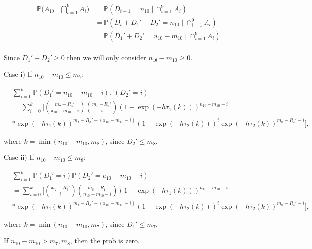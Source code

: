 \documentclass[a4paper]{article}
\theoremstyle{remark}
\begin{document}

\begin{align*}
   \mathbb{P}\bigg(A_{10}\mid \bigcap_{i=1}^{9}A_{i}\bigg)&=\mathbb{P}(D_{t+1}= n_{10} \mid \cap_{i=1}^{9}A_{i}) \\
   &= \mathbb{P}(D_{t}+D_{1}'+D_{2}'=n_{10}\mid \cap_{i=1}^{9}A_{i})\\
   &= \mathbb{P}(D_{1}'+D_{2}'=n_{10}-m_{10}\mid \cap_{i=1}^{9}A_{i})\\
\end{align*}

Since $D_{1}'+D_{2}'\geq 0$ then we will only consider $n_{10}-m_{10}\geq 0$. 

\medskip
Case i) If $n_{10}-m_{10}\leq m_7$:


\begin{align*}
    &\sum_{i=0}^{k} \mathbb{P}(D_{1}'=n_{10}-m_{10}-i)\mathbb{P}(D_{2}'=i)\\
    &=\sum_{i=0}^{k}\Bigg[{m_7-R_{3}'\choose n_{10}-m_{10}-i}{m_8-R_{4}' \choose i}(1-\exp(-h\tau_1(k)))^{n_{10}-m_{10}-i}\\
    &*\exp(-h\tau_1(k))^{m_7-R_{3}'-(n_{10}-m_{10}-i)}(1-\exp(-h\tau_2(k)))^{i}\exp(-h\tau_2(k))^{m_8-R_{4}'-i}\Bigg],
\end{align*}

where $k=\min(n_{10}-m_{10},m_8)$, since $D_{2}'\leq m_8$.


\medskip
Case ii) If $n_{10}-m_{10}\leq m_8$:


\begin{align*}
    &\sum_{i=0}^{k} \mathbb{P}(D_{1}'=i)\mathbb{P}(D_{2}'=n_{10}-m_{10}-i)\\
    &=\sum_{i=0}^{k}\Bigg[{m_7-R_{3}'\choose i}{m_8-R_{4}' \choose n_{10}-m_{10}-i}(1-\exp(-h\tau_1(k)))^{n_{10}-m_{10}-i}\\
    &*\exp(-h\tau_1(k))^{m_7-R_{3}'-(n_{10}-m_{10}-i)}(1-\exp(-h\tau_2(k)))^{i}\exp(-h\tau_2(k))^{m_8-R_{4}'-i}\Bigg],
\end{align*}

where $k=\min(n_{10}-m_{10},m_7)$, since $D_{1}'\leq m_7$.

\medskip
If $n_{10}-m_{10}> m_7,m_8$, then the prob is zero.
\end{document}

